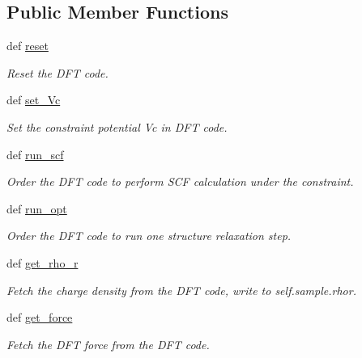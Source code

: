 \subsection*{Public Member Functions}
\begin{DoxyCompactItemize}
\item 
def \hyperlink{classpycdft_1_1dft__driver_1_1base_1_1DFTDriver_a6f98c9784f2882f921cf5f5375f6673c}{reset}
\begin{DoxyCompactList}\small\item\em Reset the D\-F\-T code. \end{DoxyCompactList}\item 
def \hyperlink{classpycdft_1_1dft__driver_1_1base_1_1DFTDriver_ae9839c712b70aa07ca4acc9108662acf}{set\-\_\-\-Vc}
\begin{DoxyCompactList}\small\item\em Set the constraint potential Vc in D\-F\-T code. \end{DoxyCompactList}\item 
def \hyperlink{classpycdft_1_1dft__driver_1_1base_1_1DFTDriver_a3385c95a524b326ffe129747ada1e30f}{run\-\_\-scf}
\begin{DoxyCompactList}\small\item\em Order the D\-F\-T code to perform S\-C\-F calculation under the constraint. \end{DoxyCompactList}\item 
def \hyperlink{classpycdft_1_1dft__driver_1_1base_1_1DFTDriver_a090d52142fecdf53a90aaed8c70d9f04}{run\-\_\-opt}
\begin{DoxyCompactList}\small\item\em Order the D\-F\-T code to run one structure relaxation step. \end{DoxyCompactList}\item 
def \hyperlink{classpycdft_1_1dft__driver_1_1base_1_1DFTDriver_a5f7a130880bd19417f7fca14851a46c3}{get\-\_\-rho\-\_\-r}
\begin{DoxyCompactList}\small\item\em Fetch the charge density from the D\-F\-T code, write to self.\-sample.\-rhor. \end{DoxyCompactList}\item 
def \hyperlink{classpycdft_1_1dft__driver_1_1base_1_1DFTDriver_aad7d8ab5afe79fa95e3110e4ad9114bc}{get\-\_\-force}
\begin{DoxyCompactList}\small\item\em Fetch the D\-F\-T force from the D\-F\-T code. \end{DoxyCompactList}\item 

\end{DoxyCompactItemize}
